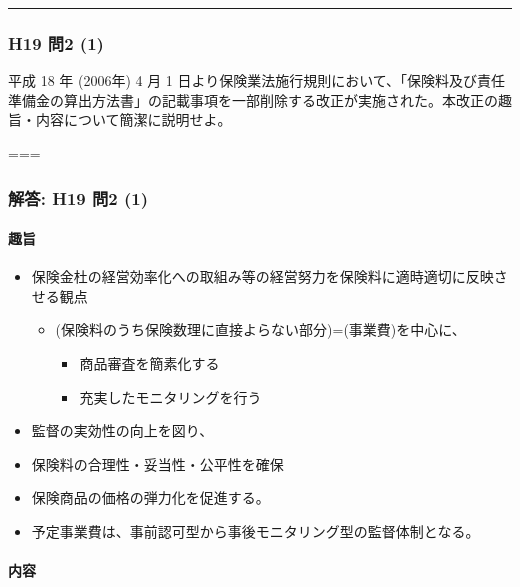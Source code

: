 \documentclass[
]{article}
\providecommand{\tightlist}{%
  \setlength{\itemsep}{0pt}\setlength{\parskip}{0pt}}
\begin{document}
\begin{center}\rule{0.5\linewidth}{0.5pt}\end{center}

\hypertarget{h19-ux554f2-1}{%
\subsubsection{H19 問2 (1)}\label{h19-ux554f2-1}}

平成 18 年 (2006年) 4 月 1
日より保険業法施行規則において、「保険料及び責任準備金の算出方法書」の記載事項を一部削除する改正が実施された。本改正の趣旨・内容について簡潔に説明せよ。

===

\hypertarget{ux89e3ux7b54-h19-ux554f2-1}{%
\subsubsection{解答: H19 問2 (1)}\label{ux89e3ux7b54-h19-ux554f2-1}}

\hypertarget{ux8da3ux65e8}{%
\paragraph{趣旨}\label{ux8da3ux65e8}}

\begin{itemize}
\tightlist
\item
  保険金杜の経営効率化への取組み等の経営努力を保険料に適時適切に反映させる観点

  \begin{itemize}
  \tightlist
  \item
    (保険料のうち保険数理に直接よらない部分)=(事業費)を中心に、

    \begin{itemize}
    \tightlist
    \item
      商品審査を簡素化する
    \item
      充実したモニタリングを行う
    \end{itemize}
  \end{itemize}
\item
  監督の実効性の向上を図り、
\item
  保険料の合理性・妥当性・公平性を確保
\item
  保険商品の価格の弾力化を促進する。
\item
  予定事業費は、事前認可型から事後モニタリング型の監督体制となる。
\end{itemize}

\hypertarget{ux5185ux5bb9}{%
\paragraph{内容}\label{ux5185ux5bb9}}
\end{document}
